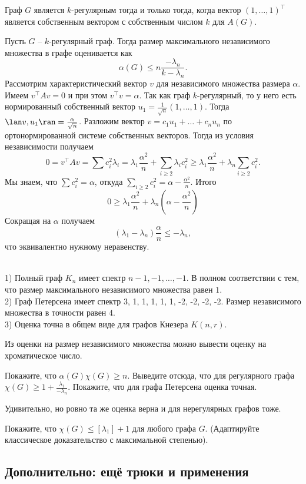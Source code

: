 \rm Граф $G$ является $k$-регулярным тогда и только тогда, когда вектор $(1,\dots,1)^\top$ является собственным вектором с собственным числом $k$ для $A(G)$.
\erm

\thrm Пусть $G$ -- $k$-регулярный граф. Тогда размер максимального независимого множества в графе оценивается как
$$\alpha(G)\leq n\frac{-\lambda_n}{k-\lambda_n}.$$
\ethrm
\proof Рассмотрим характеристический вектор $v$ для независимого множества размера $\alpha$. Имеем $v^{\top}Av=0$ и при этом $v^{\top}v=\alpha$. Так как граф $k$-регулярный, то у него есть нормированный собственный вектор $u_1=\frac{1}{\sqrt{n}}(1,\dots,1)$. Тогда $\lan v,u_1\ran = \frac{\alpha}{\sqrt{n}}$. Разложим вектор $v=c_1u_1 + \dots + c_n u_n$ по ортонормированной системе собственных векторов. Тогда из условия независимости получаем
$$0=v^{\top}Av=\sum c_i^2 \lambda_i= \lambda_1\frac{\alpha^2}{n}+ \sum_{i\geq 2} \lambda_i c_i^2\geq \lambda_1\frac{\alpha^2}{n}+ \lambda_n \sum_{i\geq 2} c_i^2.$$
Мы знаем, что $\sum c_i^2=\alpha$, откуда $\sum_{i\geq 2} c_i^2=\alpha - \frac{\alpha^2}{n}$. Итого 
$$0\geq \lambda_1\frac{\alpha^2}{n}+\lambda_n(\alpha- \frac{\alpha^2}{n})$$
Сокращая на $\alpha$ получаем 
$$(\lambda_1-\lambda_n)\frac{\alpha}{n}\leq -\lambda_n,$$
что эквивалентно нужному неравенству.
\endproof




\exm\\
1) Полный граф $K_n$ имеет спектр $n-1,-1,\dots,-1$. В полном соответствии с тем, что размер максимального независимого множества равен $1$.\\
2) Граф Петерсена имеет спектр 3, 1, 1, 1, 1, 1, -2, -2, -2, -2. Размер независимого множества в точности равен $4$.\\
3) Оценка точна в общем виде для графов Кнезера $K(n,r)$.


Из оценки на размер независимого множества можно вывести оценку на хроматическое число.

\zd Покажите, что $\alpha(G) \chi(G) \geq n$. Выведите отсюда, что для регулярного графа $\chi(G)\geq 1+ \frac{\lambda_1}{-\lambda_n}$. Покажите, что для графа Петерсена оценка точная.
\ezd

\rm Удивительно, но ровно та же оценка верна и для нерегулярных графов тоже.
\erm

\zd Покажите, что $\chi(G) \leq [\lambda_1]+1$ для любого графа $G$. (Адаптируйте классическое доказательство с максимальной степенью).
\ezd


\subsection{Дополнительно: ещё трюки и применения}


